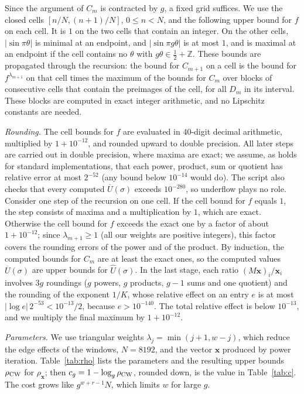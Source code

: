 \documentclass[11pt]{amsart}
\theoremstyle{definition}
\numberwithin{equation}{section}
\newcommand{\Z}{\mathbb{Z}}
\begin{document}
Since the argument of $C_m$ is contracted by $g$, a fixed grid suffices. We
use the closed cells $[n/N,(n+1)/N]$, $0\le n<N$, and the following upper
bound for $f$ on each cell. It is $1$ on the two cells that contain an
integer. On the other cells, $|\sin\pi\theta|$ is minimal at an endpoint,
and $|\sin\pi g\theta|$ is at most $1$, and is maximal at an endpoint if the
cell contains no $\theta$ with $g\theta\in\frac12+\Z$. These bounds are
propagated through the recursion: the bound for $C_{m+1}$ on a cell is the
bound for $f^{\lambda_{m+1}}$ on that cell times the maximum of the bounds
for $C_m$ over blocks of consecutive cells that contain the preimages of the
cell, for all $D_m$ in its interval. These blocks are computed in exact
integer arithmetic, and no Lipschitz constants are needed.

\emph{Rounding.} The cell bounds for $f$ are evaluated in $40$-digit
decimal arithmetic, multiplied by $1+10^{-12}$, and rounded upward to
double precision. All later steps are carried out in double precision,
where maxima are exact; we assume, as holds for standard implementations,
that each power, product, sum or quotient has relative error at most
$2^{-52}$ (any bound below $10^{-14}$ would do). The script also checks
that every computed $\overline U(\sigma)$ exceeds $10^{-280}$, so underflow
plays no role. Consider one step of the recursion on one cell. If the cell
bound for $f$ equals $1$, the step consists of maxima and a multiplication
by $1$, which are exact. Otherwise the cell bound for $f$ exceeds the exact
one by a factor of about $1+10^{-12}$; since $\lambda_{m+1}\ge1$ (all our
weights are positive integers), this factor covers the rounding errors of
the power and of the product. By induction, the computed bounds for $C_m$
are at least the exact ones, so the computed values $\overline U(\sigma)$
are upper bounds for $\widehat U(\sigma)$. In the last stage, each ratio
$(M\mathbf x)_i/\mathbf x_i$ involves $3g$ roundings ($g$ powers, $g$
products, $g-1$ sums and one quotient) and the rounding of the exponent
$1/K$, whose relative effect on an entry $e$ is at most
$|\log e|\,2^{-53}<10^{-13}/2$, because $e>10^{-140}$. The total relative
effect is below $10^{-13}$, and we multiply the final maximum by
$1+10^{-12}$.

\emph{Parameters.} We use triangular weights $\lambda_j=\min(j+1,w-j)$,
which reduce the edge effects of the windows, $N=8192$, and the vector
$\mathbf x$ produced by power iteration. Table~\ref{tab:rho} lists the
parameters and the resulting upper bounds $\rho_{\rm CW}$ for
$\rho_{\mathbf x}$; then
$c_g=1-\log_g\rho_{\rm CW}$, rounded down, is the value in
Table~\ref{tab:c}. The cost grows like $g^{w+r-1}N$, which limits $w$ for
large $g$.
\end{document}
